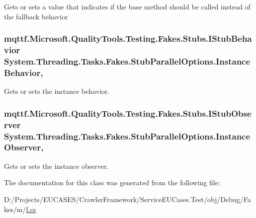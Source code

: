 Gets or sets a value that indicates if the base method should be called instead of the fallback behavior

\hypertarget{class_system_1_1_threading_1_1_tasks_1_1_fakes_1_1_stub_parallel_options_a1a4fa922dc7c9a191da7a95a1f2ea3fc}{
\subsubsection[{Instance\-Behavior}]{\setlength{\rightskip}{0pt plus 5cm}mqttf.\-Microsoft.\-Quality\-Tools.\-Testing.\-Fakes.\-Stubs.\-I\-Stub\-Behavior System.\-Threading.\-Tasks.\-Fakes.\-Stub\-Parallel\-Options.\-Instance\-Behavior\hspace{0.3cm}{\ttfamily [get]}, {\ttfamily [set]}}}\label{class_system_1_1_threading_1_1_tasks_1_1_fakes_1_1_stub_parallel_options_a1a4fa922dc7c9a191da7a95a1f2ea3fc}


Gets or sets the instance behavior.

\hypertarget{class_system_1_1_threading_1_1_tasks_1_1_fakes_1_1_stub_parallel_options_abe912d87cbac546ff25d437c9fe9c0e5}{
\subsubsection[{Instance\-Observer}]{\setlength{\rightskip}{0pt plus 5cm}mqttf.\-Microsoft.\-Quality\-Tools.\-Testing.\-Fakes.\-Stubs.\-I\-Stub\-Observer System.\-Threading.\-Tasks.\-Fakes.\-Stub\-Parallel\-Options.\-Instance\-Observer\hspace{0.3cm}{\ttfamily [get]}, {\ttfamily [set]}}}\label{class_system_1_1_threading_1_1_tasks_1_1_fakes_1_1_stub_parallel_options_abe912d87cbac546ff25d437c9fe9c0e5}


Gets or sets the instance observer.



The documentation for this class was generated from the following file\-:\begin{DoxyCompactItemize}
\item 
D\-:/\-Projects/\-E\-U\-C\-A\-S\-E\-S/\-Crawler\-Framework/\-Service\-E\-U\-Cases.\-Test/obj/\-Debug/\-Fakes/m/\hyperlink{m_2f_8cs}{f.\-cs}\end{DoxyCompactItemize}
